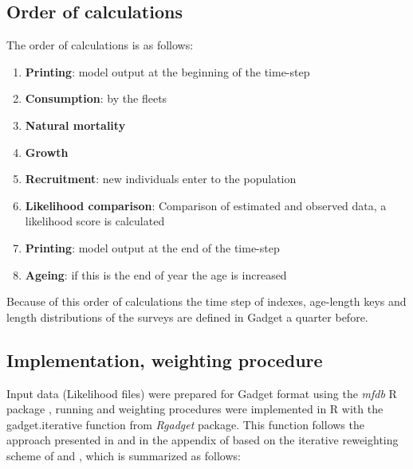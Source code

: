 \documentclass[review]{elsarticle}
\begin{document}
\subsection{Order of calculations}
The order of calculations is as follows:
\begin{enumerate}
\item \textbf{Printing}: model output at the beginning of the time-step
\item \textbf{Consumption}: by the fleets
\item \textbf{Natural mortality}
\item \textbf{Growth}
\item \textbf{Recruitment}: new individuals enter to the population
\item \textbf{Likelihood comparison}: Comparison of estimated and observed data, a likelihood score is calculated
\item \textbf{Printing}: model output at the end of the time-step
\item \textbf{Ageing}: if this is the end of year the age is increased
\end{enumerate}
Because of this order of calculations the time step of indexes, age-length keys and length distributions of the surveys are  defined in Gadget a quarter before.  



\subsection{Implementation, weighting procedure}

Input data (Likelihood files) were prepared for Gadget format using the \textit{mfdb} R package \citep{mfdb_2014}, running and weighting procedures were implemented in R with the gadget.iterative function from \textit{Rgadget} package. This function follows the approach presented in \citet{taylor_simple_2007} and in the appendix of \citet{elvarsson_bootstrap_2014} based on the iterative reweighting scheme of \citet{stefansson_comparing_1998} and \citet{stefansson_issues_2003}, which is summarized as follows:
 
\end{document}
